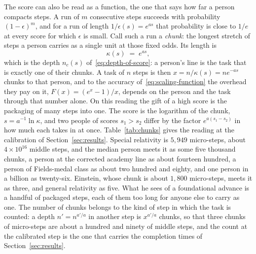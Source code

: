 \documentclass{article}
\begin{document}
The score can also be read as a function, the one that says how far a person compacts steps. A run of $m$ consecutive steps succeeds with probability $(1-\epsilon)^{m}$, and for a run of length $1/\epsilon(s) = e^{as}$ that probability is close to $1/e$ at every score for which $\epsilon$ is small. Call such a run a \emph{chunk}: the longest stretch of steps a person carries as a single unit at those fixed odds. Its length is
\begin{equation}\label{eq:chunk}
  \kappa(s) \;=\; e^{as},
\end{equation}
which is the depth $n_c(s)$ of~\eqref{eq:depth-of-score}: a person's line is the task that is exactly one of their chunks. A task of $n$ steps is then $x = n/\kappa(s) = n e^{-as}$ chunks to that person, and to the accuracy of~\eqref{eq:scaling-function} the overhead they pay on it, $F(x) = (e^{x}-1)/x$, depends on the person and the task through that number alone. On this reading the gift of a high score is the packaging of many steps into one. The score is the logarithm of the chunk, $s = a^{-1}\ln\kappa$, and two people of scores $s_1 > s_2$ differ by the factor $e^{a(s_1 - s_2)}$ in how much each takes in at once. Table~\ref{tab:chunks} gives the reading at the calibration of Section~\ref{sec:results}. Special relativity is $5{,}949$ micro-steps, about $4 \times 10^{16}$ middle steps, and the median person meets it as some five thousand chunks, a person at the corrected academy line as about fourteen hundred, a person of Fields-medal class as about two hundred and eighty, and one person in a billion as twenty-six. Einstein, whose chunk is about $1{,}800$ micro-steps, meets it as three, and general relativity as five. What he sees of a foundational advance is a handful of packaged steps, each of them too long for anyone else to carry as one. The number of chunks belongs to the kind of step in which the task is counted: a depth $n' = n^{a'/a}$ in another step is $x^{a'/a}$ chunks, so that three chunks of micro-steps are about a hundred and ninety of middle steps, and the count at the calibrated step is the one that carries the completion times of Section~\ref{sec:results}.
\end{document}
